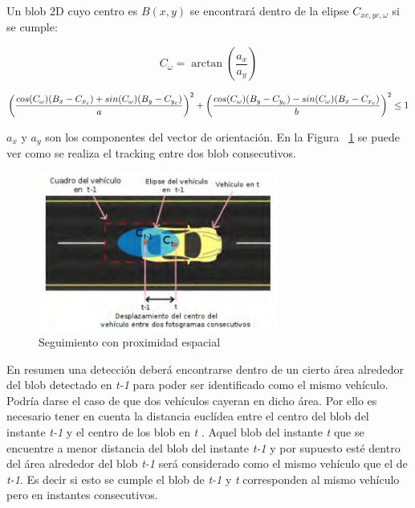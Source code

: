 Un blob 2D cuyo centro es $B(x,y)$ se encontrará dentro de la elipse  $C_{xc,yc,\omega}$ si se cumple:

\begin{equation}\label{ec.blob_elipse}
   C_{\omega} = \arctan(\frac{a_x}{a_y})
\end{equation}

\begin{equation} \scriptsize \label{ec.blob_elipse1}
   \left(\frac{cos(C_\omega)(B_x - C_{x_c}) + sin(C_\omega)(B_y - C_{y_c})}{a} \right)^2 + \left(\frac{cos(C_\omega)(B_y - C_{y_c}) - sin(C_\omega)(B_x - C_{x_c})}{b} \right)^2 \leq 1
\end{equation}

$a_x$ y $a_y$ son los componentes del vector de orientación. En la Figura ~\ref{fig.emparejamiento_blob} se puede ver como se realiza el tracking entre dos blob consecutivos. 

 \begin{figure}
\begin{center}
   \includegraphics[width=0.7\textwidth]{figures/Diseno_global/emparejamiento_blob.png}
   \caption{Seguimiento con proximidad espacial}
	\label{fig.emparejamiento_blob}
\end{center}
\end{figure}

En resumen una detección deberá encontrarse dentro de un cierto área alrededor del blob detectado en \textit{t-1} para poder ser identificado como el mismo vehículo. Podría darse el caso de que dos vehículos cayeran en dicho área. Por ello es necesario tener en cuenta la distancia euclídea entre el centro del blob del instante \textit{t-1} y el centro de los blob en \textit{t} . Aquel blob del instante \textit{t} que se encuentre a menor distancia del blob del instante \textit{t-1} y por supuesto esté dentro del área alrededor del blob \textit{t-1} será considerado como el mismo vehículo que el de \textit{
t-1}. Es decir si esto se cumple el blob de \textit{t-1} y \textit{t} corresponden al  mismo vehículo pero en instantes consecutivos.

